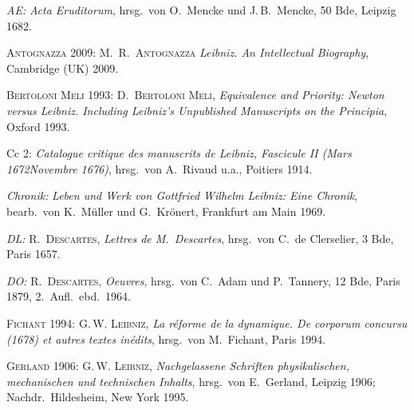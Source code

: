 \noindent\hangindent=10mm\textit{AE:} \textit{Acta Eruditorum}, hrsg.\ von O.~Mencke und J.\,B.~Mencke,
50 Bde, Leipzig 1682.\par
%
\noindent\hangindent=10mm\textsc{Antognazza} 2009: M.~R.\ \textsc{Antognazza} \textit{Leibniz. An Intellectual Biography}, Cambridge (UK) 2009.\par
%
\noindent\hangindent=10mm\textsc{Bertoloni Meli} 1993: D.\ \textsc{Bertoloni Meli}, \textit{Equivalence and Priority: Newton versus Leibniz. Including Leibniz's Unpublished Manuscripts on the Principia}, Oxford 1993.\par
%
%
%
\noindent\hangindent=10mm Cc 2: \textit{Catalogue critique des manuscrits de Leibniz, Fascicule  II (Mars 1672\textendash Novembre 1676)}, hrsg.\ von A.~Rivaud u.a., Poitiers 1914.\par
%
\noindent\hangindent=10mm\textit{Chronik:} \textit{Leben und Werk von Gottfried Wilhelm Leibniz: Eine Chronik}, bearb.\ von K.~Müller und G.~Krönert, Frankfurt am Main 1969.\par
%
\noindent\hangindent=10mm\textit{DL:} R.\ \textsc{Descartes}, \textit{Lettres de M.~Descartes}, hrsg.\ von C.~de Clerselier, 3 Bde, Paris 1657.\par
%
\noindent\hangindent=10mm\textit{DO:} R.\ \textsc{Descartes}, \textit{Oeuvres}, hrsg.\ von C.~Adam und P.~Tannery, 12 Bde, Paris 1879, 2.~Aufl.\ ebd.\ 1964.\par
%
\noindent\hangindent=10mm\textsc{Fichant} 1994: G.\,W. \textsc{Leibniz}, \textit{La réforme de la dynamique. De corporum concursu (1678) et autres textes inédits}, hrsg.\ von M.~Fichant, Paris 1994.\par
%
\noindent\hangindent=10mm\textsc{Gerland} 1906: G.\,W. \textsc{Leibniz}, \textit{Nachgelassene Schriften physikalischen, mechanischen und technischen Inhalts}, hrsg.\ von E.~Gerland, Leipzig 1906; Nachdr.\ Hildesheim, New York 1995.\par
